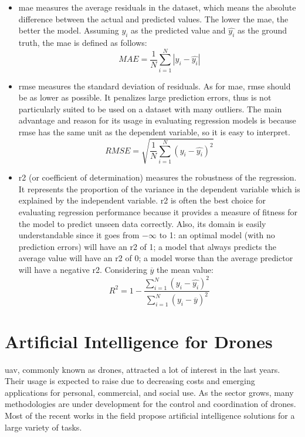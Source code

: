 \begin{itemize}
	\item \gls{mae} measures the average residuals in the dataset, which means the absolute difference between the actual and predicted values. The lower the \gls{mae}, the better the model. Assuming $y_i$ as the predicted value and $\hat{y_i}$ as the ground truth, the \gls{mae} is defined as follows:
	$$ MAE = \frac{1}{N} \sum_{i=1}^N |y_i - \hat{y_i}| $$
	
	\item \gls{rmse} measures the standard deviation of residuals. As for \gls{mae}, \gls{rmse} should be as lower as possible. It penalizes large prediction errors, thus is not particularly suited to be used on a dataset with many outliers. The main advantage and reason for its usage in evaluating regression models is because \gls{rmse} has the same unit as the dependent variable, so it is easy to interpret.
	$$ RMSE = \sqrt{\frac{1}{N} \sum_{i=1}^N (y_i - \hat{y_i})^2} $$
	
	\item \gls{r2} (or coefficient of determination) measures the robustness of the regression. It represents the proportion of the variance in the dependent variable which is explained by the independent variable. \gls{r2} is often the best choice for evaluating regression performance because it provides a measure of fitness for the model to predict unseen data correctly. Also, its domain is easily understandable since it goes from $-\infty$ to 1: an optimal model (with no prediction errors) will have an \gls{r2} of 1; a model that always predicts the average value will have an \gls{r2} of 0; a model worse than the average predictor will have a negative \gls{r2}. Considering $\overline{y}$ the mean value:
	$$ R^2 = 1 - \frac{\sum_{i=1}^N (y_i - \hat{y_i})^2}{\sum_{i=1}^N (y_i - \overline{y})^2} $$
\end{itemize}







\section{Artificial Intelligence for Drones}
\label{sec:human-drone-interaction}

\gls{uav}, commonly known as drones, attracted a lot of interest in the last years. Their usage is expected to raise due to decreasing costs and emerging applications for personal, commercial, and social use. As the sector grows, many methodologies are under development for the control and coordination of drones. Most of the recent works in the field propose artificial intelligence solutions for a large variety of tasks.

